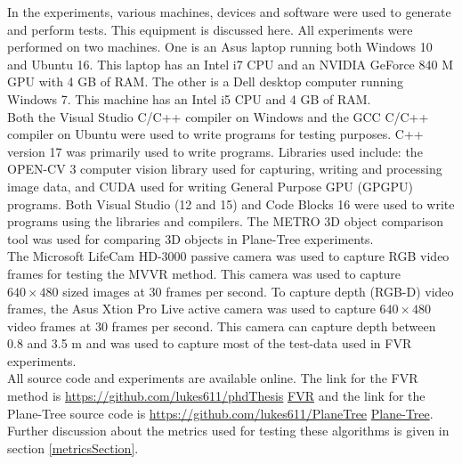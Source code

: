 
In the experiments, various machines, devices and software were used to generate and perform tests. This equipment is discussed here. All experiments were performed on two machines. One is an Asus laptop running both Windows 10 and Ubuntu 16. This laptop has an Intel i7 CPU and an NVIDIA GeForce 840 M GPU with 4 GB of RAM. The other is a Dell desktop computer running Windows 7. This machine has an Intel i5 CPU and 4 GB of RAM. \\ 

Both the Visual Studio C/C++ compiler on Windows and the GCC C/C++ compiler on Ubuntu were used to write programs for testing purposes. C++ version 17 was primarily used to write programs. Libraries used include: the OPEN-CV 3 computer vision library used for capturing, writing and processing image data, and CUDA used for writing General Purpose GPU (GPGPU) programs. Both Visual Studio (12 and 15) and Code Blocks 16 were used to write programs using the libraries and compilers. The METRO 3D object comparison tool was used for comparing 3D objects in Plane-Tree experiments. \\

The Microsoft LifeCam HD-3000 passive camera was used to capture RGB video frames for testing the MVVR method. This camera was used to capture  $640 \times 480$ sized images at 30 frames per second. To capture depth (RGB-D) video frames, the Asus Xtion Pro Live active camera was used to capture $640\times480$ video frames at 30 frames per second. This camera can capture depth between 0.8 and 3.5 m and was used to capture most of the test-data used in FVR experiments. \\ 

All source code and experiments are available online. The link for the FVR method is \url{https://github.com/lukes611/phdThesis} \href{https://github.com/lukes611/phdThesis} {FVR} and the link for the Plane-Tree source code is \url{https://github.com/lukes611/PlaneTree} \href{https://github.com/lukes611/PlaneTree}{Plane-Tree}. Further discussion about the metrics used for testing these algorithms is given in section \ref{metricsSection}. \\  
